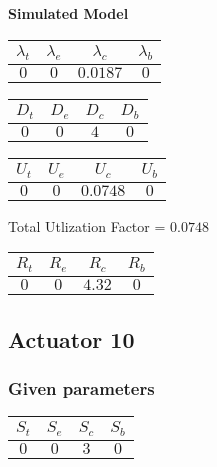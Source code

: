 \documentclass{article}
\begin{document}
\begin{minipage}{0.5\textwidth}
\centering	\textbf{Simulated Model}
\begin{table}[H]
\centering
\begin{tabular}{@{}cccc@{}}
\toprule
$\lambda_t$ & $\lambda_e$ & $\lambda_c$ & $\lambda_b$\\
\midrule
$0$ & $0$ & $0.0187$ & $0$\\
\bottomrule
\end{tabular}
\end{table}
\begin{table}[H]
\centering
\begin{tabular}{@{}cccc@{}}
\toprule
$D_t$ & $D_e$ & $D_c$ & $D_b$\\
\midrule
$0$ & $0$ & $4$ & $0$\\
\bottomrule
\end{tabular}
\end{table}\begin{table}[H]
\centering
\begin{tabular}{@{}cccc@{}}
\toprule
$U_t$ & $U_e$ & $U_c$ & $U_b$\\
\midrule
$0$ & $0$ & $0.0748$ & $0$\\
\bottomrule
\end{tabular}
\end{table}
\centering Total Utlization Factor = $0.0748$
\begin{table}[H]
\centering
\begin{tabular}{@{}cccc@{}}
\toprule
$R_t$ & $R_e$ & $R_c$ & $R_b$\\
\midrule
$0$ & $0$ & $4.32$ & $0$\\
\bottomrule
\end{tabular}
\end{table}
\end{minipage}\subsection{Actuator 10}
\subsubsection{Given parameters}
\begin{table}[H]
\centering
\begin{tabular}{@{}cccc@{}}
\toprule
$S_t$ & $S_e$ & $S_c$ & $S_b$\\
\midrule
$0$ & $0$ & $3$ & $0$\\
\bottomrule
\end{tabular}
\end{table}
\end{document}
